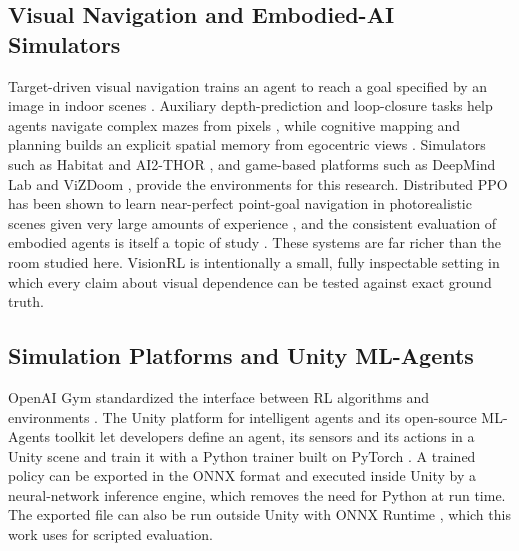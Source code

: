 \documentclass[conference]{IEEEtran}
\begin{document}
\subsection{Visual Navigation and Embodied-AI Simulators}
Target-driven visual navigation trains an agent to reach a goal specified by an image in indoor scenes \cite{zhu2017target}. Auxiliary depth-prediction and loop-closure tasks help agents navigate complex mazes from pixels \cite{mirowski2017navigate}, while cognitive mapping and planning builds an explicit spatial memory from egocentric views \cite{gupta2017cmp}. Simulators such as Habitat \cite{savva2019habitat} and AI2-THOR \cite{kolve2017ai2thor}, and game-based platforms such as DeepMind Lab \cite{beattie2016dmlab} and ViZDoom \cite{kempka2016vizdoom}, provide the environments for this research. Distributed PPO has been shown to learn near-perfect point-goal navigation in photorealistic scenes given very large amounts of experience \cite{wijmans2020ddppo}, and the consistent evaluation of embodied agents is itself a topic of study \cite{anderson2018evaluation}. These systems are far richer than the room studied here. VisionRL is intentionally a small, fully inspectable setting in which every claim about visual dependence can be tested against exact ground truth.


\subsection{Simulation Platforms and Unity ML-Agents}
OpenAI Gym standardized the interface between RL algorithms and environments \cite{brockman2016gym}. The Unity platform for intelligent agents \cite{juliani2018unity} and its open-source ML-Agents toolkit \cite{mlagents_repo} let developers define an agent, its sensors and its actions in a Unity scene and train it with a Python trainer built on PyTorch \cite{paszke2019pytorch}. A trained policy can be exported in the ONNX format \cite{onnx} and executed inside Unity by a neural-network inference engine, which removes the need for Python at run time. The exported file can also be run outside Unity with ONNX Runtime \cite{onnxruntime}, which this work uses for scripted evaluation.
\end{document}
